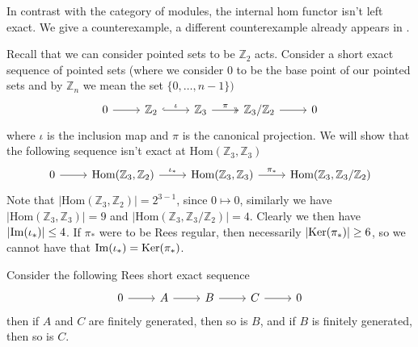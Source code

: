 In contrast with the category of modules, the 
internal hom functor isn't left exact. We give a counterexample, a different 
counterexample already appears in \cite{Chen02}.
\begin{example}
    Recall that we can consider pointed sets to be $\mathbb{Z}_2$ acts. Consider a 
    short exact sequence of pointed sets (where we consider $0$ to be the base point of our pointed sets and by $\mathbb{Z}_n$ we mean the set $\{0,\dots,n-1\})$
    \[\begin{tikzcd}
        0 & {\mathbb{Z}_2} & {\mathbb{Z}_3} & {\mathbb{Z}_3/\mathbb{Z}_2} & 0
        \arrow[from=1-1, to=1-2]
        \arrow["\iota", hook, from=1-2, to=1-3]
        \arrow["\pi", two heads, from=1-3, to=1-4]
        \arrow[from=1-4, to=1-5]
    \end{tikzcd}\]
    where $\iota$ is the inclusion map and $\pi$ is the canonical projection.
    We will show that the following sequence isn't exact at $\text{Hom}(\mathbb{Z}_3,\mathbb{Z}_3)$
    \[\begin{tikzcd}
        0 & {\text{Hom}(\mathbb{Z}_3,\mathbb{Z}_2)} & {\text{Hom}(\mathbb{Z}_3,\mathbb{Z}_3)} & {\text{Hom}(\mathbb{Z}_3,\mathbb{Z}_3/\mathbb{Z}_2)}
        \arrow[from=1-1, to=1-2]
        \arrow["{\iota_*}", from=1-2, to=1-3]
        \arrow["{\pi_*}", from=1-3, to=1-4]
    \end{tikzcd}\]
    Note that $\left|\text{Hom}(\mathbb{Z}_3,\mathbb{Z}_2)\right| = 2^{3-1}$, since $0\mapsto 0$, similarly we have 
    $\left|\text{Hom}(\mathbb{Z}_3,\mathbb{Z}_3) \right| =9$ and $\left|\text{Hom}(\mathbb{Z}_3,\mathbb{Z}_3/\mathbb{Z}_2)\right| = 4$.
    Clearly we then have $\left|\mathrm{Im}(\iota_*)\right|\leq 4$. If $\pi_*$ were to be Rees regular, then necessarily 
    $\left|\mathrm{Ker}(\pi_*)\right| \geq 6$, so we cannot have that $\mathrm{Im}(\iota_*)=\mathrm{Ker}(\pi_*)$.
\end{example}
\begin{proposition}
    Consider the following Rees short exact sequence
    \[\begin{tikzcd}
        0 & A & B & C & 0
        \arrow[from=1-1, to=1-2]
        \arrow[from=1-2, to=1-3]
        \arrow[from=1-3, to=1-4]
        \arrow[from=1-4, to=1-5]
    \end{tikzcd}\]
    then if $A$ and $C$ are finitely generated, then so is $B$, and if $B$ is finitely generated, then so is $C$.
\end{proposition}
